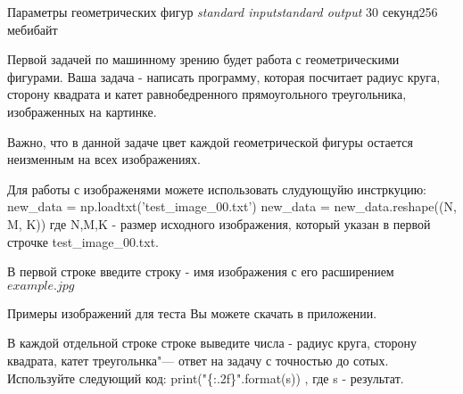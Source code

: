 \begin{problem}{Параметры геометрических фигур}
{\textsl{standard input}}{\textsl{standard output}}
{30 секунд}{256 мебибайт}{}

Первой задачей по машинному зрению будет работа с геометрическими фигурами. 
Ваша задача - написать программу, которая посчитает радиус круга, сторону квадрата и катет равнобедренного прямоугольного треугольника, изображенных на картинке. 

Важно, что в данной задаче цвет каждой геометрической фигуры остается неизменным на всех изображениях.

Для работы с изображенями можете использовать слудующуйю инстркуцию:
new_data = np.loadtxt('test_image_00.txt')
new_data = new_data.reshape((N, M, K))
где N,M,K - размер исходного изображения, который указан в первой строчке test_image_00.txt.

\InputFile

В первой строке введите строку - имя изображения с его расширением $example.jpg$

Примеры изображений для теста Вы можете скачать в приложении.

\OutputFile

В каждой отдельной строке строке выведите числа - радиус круга, сторону квадрата, катет треугольнка"--- ответ на задачу с точностью до сотых.
Используйте следующий код: print("\{:.2f\}".format(s)) , где s - результат.

\Examples

\begin{example}
%

%


\end{example}

\Explanations

\end{problem}
